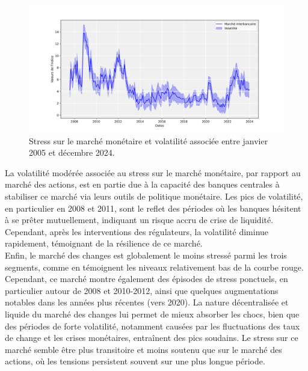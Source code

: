 \begin{sloppypar}
\begin{figure}[H]
    \centering
    \includegraphics[width=1\linewidth]{figures/sous_indicateurs_stress_imm.png}
    \caption{Stress sur le marché monétaire et volatilité associée entre janvier 2005 et décembre 2024.}
    \label{fig:enter-label}
\end{figure}

La volatilité modérée associée au stress sur le marché monétaire, par rapport au marché des actions, est en partie due à la capacité des banques centrales à stabiliser ce marché via leurs outils de politique monétaire. Les pics de volatilité, en particulier en 2008 et 2011, sont le reflet des périodes où les banques hésitent à se prêter mutuellement, indiquant un risque accru de crise de liquidité. Cependant, après les interventions des régulateurs, la volatilité diminue rapidement, témoignant de la résilience de ce marché.\\

Enfin, le marché des changes est globalement le moins stressé parmi les trois segments, comme en témoignent les niveaux relativement bas de la courbe rouge. Cependant, ce marché montre également des épisodes de stress ponctuels, en particulier autour de 2008 et 2010-2012, ainsi que quelques augmentations notables dans les années plus récentes (vers 2020). La nature décentralisée et liquide du marché des changes lui permet de mieux absorber les chocs, bien que des périodes de forte volatilité, notamment causées par les fluctuations des taux de change et les crises monétaires, entraînent des pics soudains. Le stress sur ce marché semble être plus transitoire et moins soutenu que sur le marché des actions, où les tensions persistent souvent sur une plus longue période.


\end{sloppypar}
